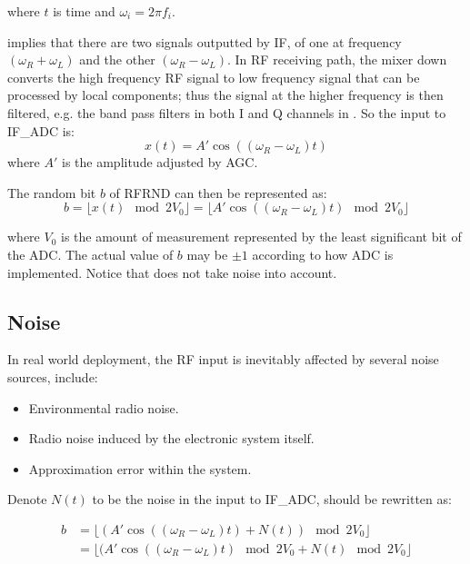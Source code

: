 where $t$ is time and $\omega_i = 2{\pi}f_i$.

 implies that there are two signals outputted by IF, of one at frequency $(\omega_{R} + \omega_{L})$ and the other $(\omega_{R} - \omega_{L})$. In RF receiving path,  the mixer down converts the high frequency RF signal to low frequency signal that can be processed by local components; thus the signal at the higher frequency is then filtered, e.g. the band pass filters in both I and Q channels in . So the input to IF\_ADC is:
\begin{equation}
x(t) = A'\cos((\omega_{R} - \omega_{L})t)
\end{equation}
where $A'$ is the amplitude adjusted by AGC. 

The random bit $b$ of RFRND can then be represented as:
\begin{equation} \label{RFRND}
b = \lfloor{x(t)} \mod 2V_0 \rfloor = \lfloor{A'\cos((\omega_{R} - \omega_{L})t) \mod 2V_0 }\rfloor
\end{equation}

where $V_0$ is the amount of measurement represented by the least significant bit of the ADC. The actual value of $b$ may be $\pm 1$ according to how ADC is implemented. Notice that  does not take noise into account.

\subsection{Noise}

In real world deployment, the RF input is inevitably affected by several noise sources, include:

\begin{itemize}
\item Environmental radio noise.
\item Radio noise induced by the electronic system itself.
\item Approximation error within the system.
\end{itemize}

Denote $N(t)$ to be the noise in the input to IF\_ADC,  should be rewritten as:

\begin{equation} \label{RFRND_noise}
\begin{split}
b &= \lfloor{(A'\cos((\omega_{R} - \omega_{L})t) + N(t) )\mod 2V_0 }\rfloor \\
&= \lfloor{(A'\cos((\omega_{R} - \omega_{L})t) \mod 2V_0 + N(t) \mod 2V_0 }\rfloor
\end{split}
\end{equation}

